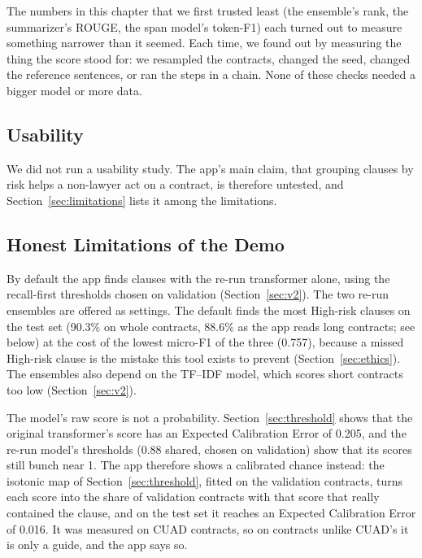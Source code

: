 The numbers in this chapter that we first trusted least (the ensemble's rank, the summarizer's ROUGE, the span model's token-F1) each turned out to measure something narrower than it seemed. Each time, we found out by measuring the thing the score stood for: we resampled the contracts, changed the seed, changed the reference sentences, or ran the steps in a chain. None of these checks needed a bigger model or more data.

\subsection{Usability}
\label{sec:usability}
We did not run a usability study. The app's main claim, that grouping clauses by risk helps a non-lawyer act on a contract, is therefore untested, and Section~\ref{sec:limitations} lists it among the limitations.
\subsection{Honest Limitations of the Demo}
\label{sec:demolimits}
By default the app finds clauses with the re-run transformer alone, using the recall-first thresholds chosen on validation (Section~\ref{sec:v2}). The two re-run ensembles are offered as settings. The default finds the most High-risk clauses on the test set (90.3\% on whole contracts, 88.6\% as the app reads long contracts; see below) at the cost of the lowest micro-F1 of the three (0.757), because a missed High-risk clause is the mistake this tool exists to prevent (Section~\ref{sec:ethics}). The ensembles also depend on the TF--IDF model, which scores short contracts too low (Section~\ref{sec:v2}).

The model's raw score is not a probability. Section~\ref{sec:threshold} shows that the original transformer's score has an Expected Calibration Error of 0.205, and the re-run model's thresholds (0.88 shared, chosen on validation) show that its scores still bunch near 1. The app therefore shows a calibrated chance instead: the isotonic map of Section~\ref{sec:threshold}, fitted on the validation contracts, turns each score into the share of validation contracts with that score that really contained the clause, and on the test set it reaches an Expected Calibration Error of 0.016. It was measured on CUAD contracts, so on contracts unlike CUAD's it is only a guide, and the app says so.

